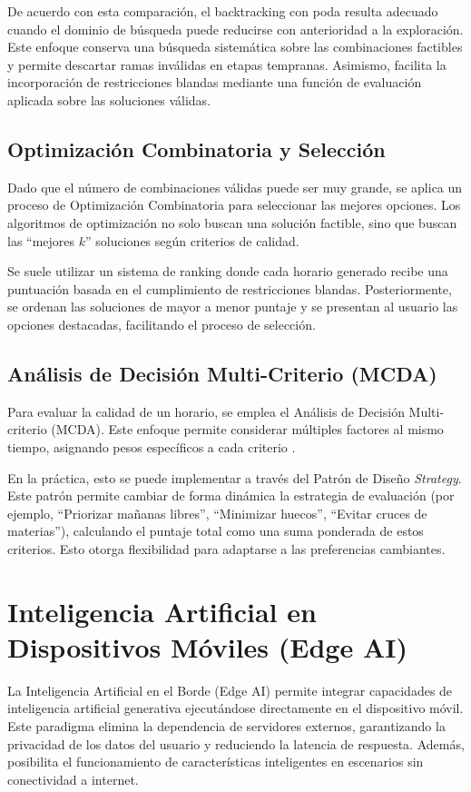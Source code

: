 De acuerdo con esta comparación, el backtracking con poda resulta adecuado cuando el dominio de búsqueda puede reducirse con anterioridad a la exploración. Este enfoque conserva una búsqueda sistemática sobre las combinaciones factibles y permite descartar ramas inválidas en etapas tempranas. Asimismo, facilita la incorporación de restricciones blandas mediante una función de evaluación aplicada sobre las soluciones válidas.

\subsection{Optimización Combinatoria y Selección}
Dado que el número de combinaciones válidas puede ser muy grande, se aplica un proceso de Optimización Combinatoria para seleccionar las mejores opciones. Los algoritmos de optimización no solo buscan una solución factible, sino que buscan las ``mejores $k$'' soluciones según criterios de calidad.

Se suele utilizar un sistema de ranking donde cada horario generado recibe una puntuación basada en el cumplimiento de restricciones blandas. Posteriormente, se ordenan las soluciones de mayor a menor puntaje y se presentan al usuario las opciones destacadas, facilitando el proceso de selección.

\subsection{Análisis de Decisión Multi-Criterio (MCDA)}
Para evaluar la calidad de un horario, se emplea el Análisis de Decisión Multi-criterio (MCDA). Este enfoque permite considerar múltiples factores al mismo tiempo, asignando pesos específicos a cada criterio \cite{triantaphyllou2000multi}.

En la práctica, esto se puede implementar a través del Patrón de Diseño \textit{Strategy}. Este patrón permite cambiar de forma dinámica la estrategia de evaluación (por ejemplo, ``Priorizar mañanas libres'', ``Minimizar huecos'', ``Evitar cruces de materias''), calculando el puntaje total como una suma ponderada de estos criterios. Esto otorga flexibilidad para adaptarse a las preferencias cambiantes.

\section{Inteligencia Artificial en Dispositivos Móviles (Edge AI)}
\label{sec:edge-ai}

La Inteligencia Artificial en el Borde (Edge AI) permite integrar capacidades de inteligencia artificial generativa ejecutándose directamente en el dispositivo móvil. Este paradigma elimina la dependencia de servidores externos, garantizando la privacidad de los datos del usuario y reduciendo la latencia de respuesta. Además, posibilita el funcionamiento de características inteligentes en escenarios sin conectividad a internet.

